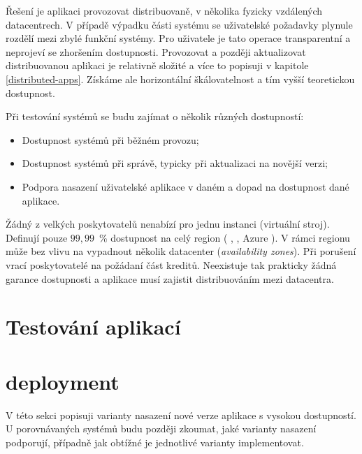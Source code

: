         Řešení je aplikaci provozovat distribuovaně, v několika fyzicky vzdálených datacentrech. V případě výpadku části systému se uživatelské požadavky plynule rozdělí mezi zbylé funkční systémy. Pro uživatele je tato operace transparentní a neprojeví se zhoršením dostupnosti. Provozovat a později aktualizovat distribuovanou aplikaci je relativně složité a více to popisuji v kapitole \ref{distributed-apps}. Získáme ale horizontální škálovatelnost a tím vyšší teoretickou dostupnost.

        Při testování \CICD systémů se budu zajímat o několik různých dostupností:
        \begin{itemize}
            \item Dostupnost \CICD systémů při běžném provozu;
            \item Dostupnost \CICD systémů při správě, typicky při aktualizaci na novější verzi;
            \item Podpora nasazení uživatelské aplikace v daném \CICD a dopad na dostupnost dané aplikace.
        \end{itemize}

        Žádný z velkých poskytovatelů nenabízí  pro jednu instanci (virtuální stroj). Definují pouze $99,99$~\% dostupnost na celý region ( \cite{aws-sla},  \cite{gcp-sla}, Azure \cite{azure-sla}). V rámci regionu může bez vlivu na  vypadnout několik datacenter (\textit{availability zones}). Při porušení  vrací poskytovatelé na požádaní část kreditů. Neexistuje tak prakticky žádná garance dostupnosti a aplikace musí  zajistit distribuováním mezi datacentra.

    \section{Testování aplikací}
        \blind[2]
        \blind[1]

    \section{deployment}
        \blind[1]

        V této sekci popisuji varianty nasazení nové verze aplikace s vysokou dostupností. U porovnávaných \CICD systémů budu později zkoumat, jaké varianty nasazení podporují, případně jak obtížné je jednotlivé varianty implementovat.


